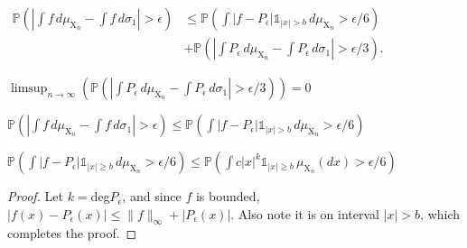 

\begin{lemma}
    \label{lem:reestimate}
     $\begin{align*} \mathbb{P}\left( \left|\int f\,d\mu_{\mathrm{X}_n} - \int f\,d\sigma_1\right|>\epsilon\right) &\le \mathbb{P}\left(\int |f-P_\epsilon|\mathbb{1}_{|x|> b}\,d\mu_{\mathrm{X}_n}>\epsilon/6\right) \\ 
     &+ \mathbb{P}\left(\left|\int P_\epsilon\,d\mu_{\mathrm{X}_n} - \int P_\epsilon\,d\sigma_1\right| >\epsilon/3\right).
     \end{align*}$
\end{lemma}


\begin{lemma}
    \label{lem:second_term_estimate}
    \uses{} %
    \notready
    $ \limsup_{n \to \infty} \left(\mathbb{P}\left(\left|\int P_\epsilon\,d\mu_{\mathrm{X}_n} - \int P_\epsilon\,d\sigma_1\right| >\epsilon/3\right) \right) = 0 $

\end{lemma}



\begin{lemma}
    \label{lem:final_estimate}
    $\mathbb{P}\left( \left|\int f\,d\mu_{\mathrm{X}_n} - \int f\,d\sigma_1\right|>\epsilon\right) \leq \mathbb{P}\left(\int |f-P_\epsilon|\mathbb{1}_{|x|> b}\,d\mu_{\mathrm{X}_n}>\epsilon/6\right)$
\end{lemma}



\begin{lemma}  
    \label{lem:polynomial_ineq}
    \uses{}
    $ \mathbb{P}\left(\int |f-P_\epsilon| \mathbb{1}_{|x|\ge b}\,d\mu_{\mathrm{X}_n} > \epsilon/6\right) \le \mathbb{P}\left(\int c|x|^k\mathbb{1}_{|x|\ge b}\,\mu_{\mathrm{X}_n}(dx) > \epsilon/6\right) $
    \begin{proof}
    Let $k =$deg$P_\epsilon$, and since $f$ is bounded, $|f(x) - P_{\epsilon}(x)| \leq \|f\|_{\infty} + |P_\epsilon(x)|$. Also note it is on interval $|x| > b$, which completes the proof.
    \end{proof}
\end{lemma}



